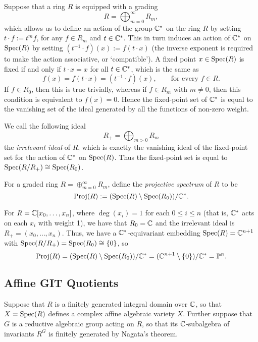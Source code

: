 Suppose that a ring $R$ is equipped with a grading
$$
R = \bigoplus_{m=0}^{\infty}R_{m},
$$
which allows us to define an action of the group $\mathbb{C}^{\ast}$ on the ring $R$ by setting $t \cdot f := t^{m}f$, for any $f \in R_{m}$ and $t \in \mathbb{C}^{\ast}$. This in turn induces an action of $\mathbb{C}^{\ast}$ on $\operatorname{Spec}(R)$ by setting $(t^{-1} \cdot f)(x) := f(t\cdot x)$ (the inverse exponent is required to make the action associative, or `compatible'). A fixed point $x \in \operatorname{Spec}(R)$ is fixed if and only if $t\cdot x = x$ for all $t \in \mathbb{C}^{\ast}$, which is the same as
$$
f(x) = f(t\cdot x) = (t^{-1} \cdot f)(x),\qquad \text{for every } f \in R.
$$
If $f \in R_{0}$, then this is true trivially, whereas if $f \in R_{m}$ with $m \neq 0$, then this condition is equivalent to $f(x) = 0$. Hence the fixed-point set of $\mathbb{C}^{\ast}$ is equal to the vanishing set of the ideal generated by all the functions of non-zero weight.

We call the following ideal
$$
R_{+} = \bigoplus_{m > 0} R_{m}
$$
the \emph{irrelevant ideal} of $R$, which is exactly the vanishing ideal of the fixed-point set for the action of $\mathbb{C}^{\ast}$ on $\operatorname{Spec}(R)$. Thus the fixed-point set is equal to $\operatorname{Spec}(R/R_{+}) \cong \operatorname{Spec}(R_{0})$.

\begin{defn}
	For a graded ring $R = \oplus_{m = 0}^{\infty}R_{m}$, define the \emph{projective spectrum} of $R$ to be
	$$
	\operatorname{Proj}(R) := (\operatorname{Spec}(R) \setminus \operatorname{Spec}(R_{0}))/\mathbb{C}^{\ast}.
	$$
\end{defn}

\begin{ex}
	For $R = \mathbb{C}[x_{0}, \ldots, x_{n}]$, where $\deg(x_{i}) = 1$ for each $0 \leq i \leq n$ (that is, $\mathbb{C}^{\ast}$ acts on each $x_{i}$ with weight 1), we have that $R_{0} = \mathbb{C}$ and the irrelevant ideal is $R_{+} = (x_{0}, \ldots, x_{n})$. Thus, we have a $\mathbb{C}^{\ast}$-equivariant embedding $\operatorname{Spec}(R) = \mathbb{C}^{n+1}$ with $\operatorname{Spec}(R/R_{+}) = \operatorname{Spec}(R_{0}) \cong \{0\}$, so
	$$
	\operatorname{Proj}(R) = (\operatorname{Spec}(R) \setminus \operatorname{Spec}(R_{0}) )/\mathbb{C}^{\ast} = (\mathbb{C}^{n+1} \setminus \{0\} )/\mathbb{C}^{\ast} = \mathbb{P}^{n}.
	$$
\end{ex}

\subsection{Affine GIT Quotients}

Suppose that $R$ is a finitely generated integral domain over $\mathbb{C}$, so that $X = \operatorname{Spec}(R)$ defines a complex affine algebraic variety $X$. Further suppose that $G$ is a reductive algebraic group acting on $R$, so that its $\mathbb{C}$-subalgebra of invariants $R^{G}$ is finitely generated by Nagata's theorem.

